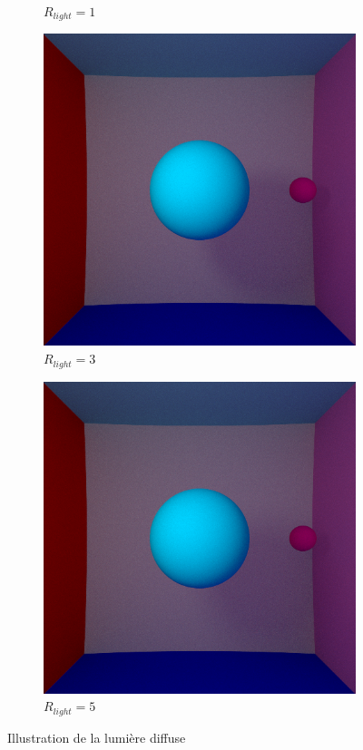 \documentclass[12pt,a4paper,twoside]{report}
\begin{document}
\begin{figure}[H]
\begin{subfigure}{.45\textwidth}
		\caption{$R_{light} = 1$}
		\label{fig:be4_01_1000_1}
	\end{subfigure}
	\begin{subfigure}{.45\textwidth}
		\centering
		\includegraphics[width=1.\linewidth]{be4_01_1000_3}
		\caption{$R_{light} = 3$}
		\label{fig:be4_01_1000_3}
	\end{subfigure}
	\begin{subfigure}{.45\textwidth}
		\centering
		\includegraphics[width=1.\linewidth]{be4_01_1000_5}
		\caption{$R_{light} = 5$}
		\label{fig:be4_01_1000_5}
	\end{subfigure}
	\caption{Illustration de la lumière diffuse}
	\label{fig:be4_01}
\end{figure}
\end{document}
